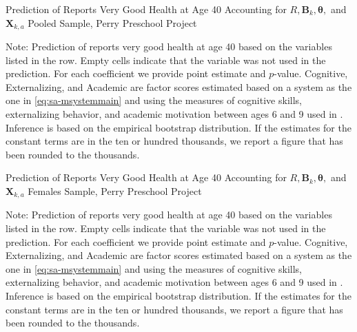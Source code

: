 \begin{table}
\begin{threeparttable}
\caption{Prediction of Reports Very Good Health at Age 40 Accounting for $R, \bm{B}_k, \bm{\theta},$ and $\bm{X}_{k,a}$ Pooled Sample, Perry Preschool Project}
\label{table:perry3}
\centering
\scriptsize

\begin{tablenotes}
\footnotesize
\item Note: Prediction of reports very good health at age 40 based on the variables listed in the row. Empty cells indicate that the variable was not used in the prediction. For each coefficient we provide point estimate and $p$-value. Cognitive, Externalizing, and Academic are factor scores estimated based on a system as the one in \eqref{eq:sa-msystemmain} and using the measures of cognitive skills, externalizing behavior, and academic motivation between ages 6 and 9 used in \citet{Heckman_Pinto_etal_2013_PerryFactor}. Inference is based on the empirical bootstrap distribution. If the estimates for the constant terms are in the ten or hundred thousands, we report a figure that has been rounded to the thousands.
\end{tablenotes}
\end{threeparttable}
\end{table}

\begin{table}
\begin{threeparttable}
\caption{Prediction of Reports Very Good Health at Age 40 Accounting for $R, \bm{B}_k, \bm{\theta},$ and $\bm{X}_{k,a}$ Females Sample, Perry Preschool Project}
\label{table:perry3}
\centering
\scriptsize

\begin{tablenotes}
\footnotesize
\item Note: Prediction of reports very good health at age 40 based on the variables listed in the row. Empty cells indicate that the variable was not used in the prediction. For each coefficient we provide point estimate and $p$-value. Cognitive, Externalizing, and Academic are factor scores estimated based on a system as the one in \eqref{eq:sa-msystemmain} and using the measures of cognitive skills, externalizing behavior, and academic motivation between ages 6 and 9 used in \citet{Heckman_Pinto_etal_2013_PerryFactor}. Inference is based on the empirical bootstrap distribution. If the estimates for the constant terms are in the ten or hundred thousands, we report a figure that has been rounded to the thousands.
\end{tablenotes}
\end{threeparttable}
\end{table}

